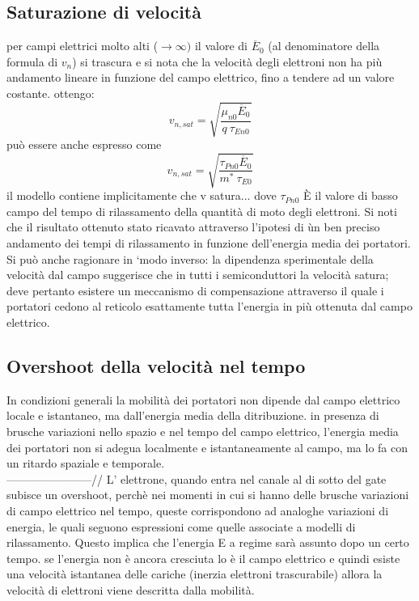 \subsection{Saturazione di velocità}
per campi elettrici molto alti ($\rightarrow \infty)$ il valore di $\overline{E}_0$ (al denominatore della formula di $v_n$) si trascura e  si nota che la velocità degli elettroni non ha più andamento lineare in funzione del campo elettrico, fino a tendere ad un valore costante. ottengo:
%
\begin{equation}
     v_{n,sat}=\sqrt{\dfrac{\mu_{n0} \overline{E}_0}{q\ \tau_{En0}}}
\end{equation}
%
può essere anche espresso come 
%
\begin{equation}
     v_{n,sat}= \sqrt{\dfrac{\tau_{Pn0}\overline{E}_0}{m^*\ \tau_{E0}}}
\end{equation}
%
il modello contiene implicitamente che v satura...
dove $\tau_{Pn0}$ È il valore di basso campo del tempo di rilassamento della quantità di moto degli elettroni. Si noti che il risultato ottenuto stato ricavato attraverso l’ipotesi di ùn ben preciso andamento dei tempi di rilassamento in funzione dell’energia media dei portatori. Si può anche ragionare in ‘modo inverso: la dipendenza sperimentale della velocità dal campo suggerisce che in tutti i semiconduttori la velocità satura; deve pertanto esistere un meccanismo di compensazione attraverso il quale i portatori cedono al reticolo esattamente tutta l’energia in più ottenuta dal campo elettrico.  
%
\subsection{Overshoot della velocità nel tempo}
In condizioni generali la mobilità dei portatori non dipende dal campo elettrico locale e istantaneo, ma dall'energia media della ditribuzione. in presenza di brusche variazioni nello spazio e nel tempo del campo elettrico, l'energia media dei portatori non si adegua localmente e istantaneamente al campo, ma lo fa con un ritardo spaziale e temporale.\\
-----------------------//
L' elettrone, quando entra nel canale al di sotto del gate subisce un overshoot, perchè nei momenti in cui si hanno delle brusche variazioni di campo elettrico nel tempo, queste corrispondono ad analoghe variazioni di energia, le quali seguono espressioni come quelle associate a modelli di rilassamento.
Questo implica che l'energia E a regime sarà assunto dopo un certo tempo. se l'energia non è ancora cresciuta lo è il campo elettrico e quindi esiste una velocità istantanea delle cariche (inerzia elettroni trascurabile) allora la velocità di elettroni viene descritta dalla mobilità.

